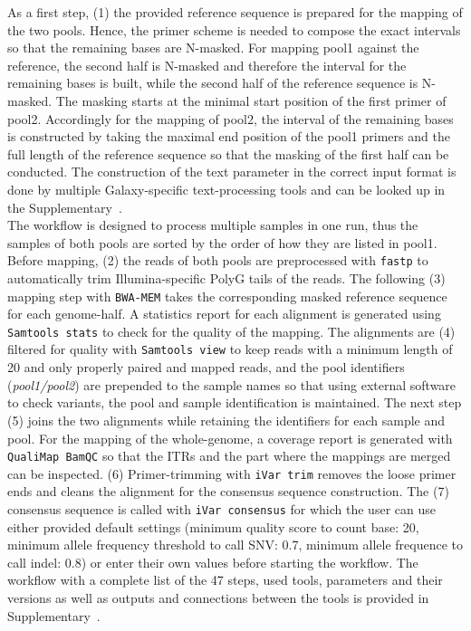 As a first step, (1) the provided reference sequence is prepared for the mapping of the two pools. Hence, the primer scheme is needed to compose the exact intervals so that the remaining bases are N-masked. For mapping pool1 against the reference, the second half is N-masked and therefore the interval for the remaining bases is built, while the second half of the reference sequence is N-masked. The masking starts at the minimal start position of the first primer of pool2. Accordingly for the mapping of pool2, the interval of the remaining bases is constructed by taking the maximal end position of the pool1 primers and the full length of the reference sequence so that the masking of the first half can be conducted. The construction of the text parameter in the correct input format is done by multiple Galaxy-specific text-processing tools and can be looked up in the Supplementary~. \\
The workflow is designed to process multiple samples in one run, thus the samples of both pools are sorted by the order of how they are listed in pool1. Before mapping, (2) the reads of both pools are preprocessed with \texttt{fastp} to automatically trim Illumina-specific PolyG tails of the reads. The following (3) mapping step with \texttt{BWA-MEM} takes the corresponding masked reference sequence for each genome-half. A statistics report for each alignment is generated using \texttt{Samtools stats} to check for the quality of the mapping. The alignments are (4) filtered for quality with \texttt{Samtools view} to keep reads with a minimum length of 20 and only properly paired and mapped reads, and the pool identifiers (\textit{pool1/pool2}) are prepended to the sample names so that using external software to check variants, the pool and sample identification is maintained. The next step (5) joins the two alignments while retaining the identifiers for each sample and pool. For the mapping of the whole-genome, a coverage report is generated with \texttt{QualiMap BamQC} so that the \acp{ITR} and the part where the mappings are merged can be inspected. (6) Primer-trimming with \texttt{iVar trim} removes the loose primer ends and cleans the alignment for the consensus sequence construction. The (7) consensus sequence is called with \texttt{iVar consensus} for which the user can use either provided default settings (minimum quality score to count base: 20, minimum allele frequency threshold to call SNV: 0.7, minimum allele frequence to call indel: 0.8) or enter their own values before starting the workflow. The workflow with a complete list of the 47 steps, used tools, parameters and their versions as well as outputs and connections between the tools is provided in Supplementary~. 

